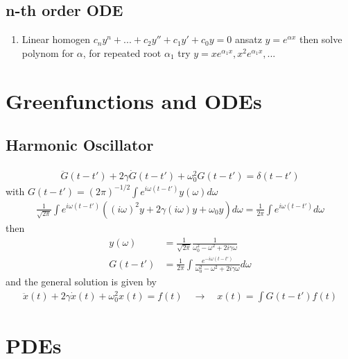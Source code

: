 \documentclass[../main.tex]{subfiles}
\begin{document}
\subsection{n-th order ODE}
\begin{enumerate}
\item Linear homogen $c_ny^{n}+...+c_{2}y''+c_{1}y'+c_{0}y=0$ ansatz $y=e^{\alpha x}$ then solve polynom for $\alpha$,  for repeated root $\alpha_1$ try $y=xe^{\alpha_1 x}, x^2e^{\alpha_1 x}, ...$
\end{enumerate}




\section{Greenfunctions and ODEs}
\subsection{Harmonic Oscillator}
\begin{align}
\ddot{G}(t-t')+2\gamma\dot{G}(t-t')+\omega_0^2G(t-t')=\delta(t-t')
\end{align}
with $G(t-t')=(2\pi)^{-1/2}\int e^{i\omega (t-t')}y(\omega)d\omega$
\begin{align}
\frac{1}{\sqrt{2\pi}}\int e^{i\omega (t-t')}\left((i\omega)^2y+2\gamma(i\omega)y+\omega_0y\right)d\omega=\frac{1}{2\pi}\int e^{i\omega(t-t')}d\omega
\end{align}
then
\begin{align}
y(\omega)&=\frac{1}{\sqrt{2\pi}}\frac{1}{\omega_0^2-\omega^2+2i\gamma\omega}\\
G(t-t')&=\frac{1}{2\pi}\int \frac{e^{-i\omega(t-t')}}{\omega_0^2-\omega^2+2i\gamma\omega}d\omega
\end{align}
and the general solution is given by
\begin{align}
\ddot{x}(t)+2\gamma\dot{x}(t)+\omega_0^2x(t)=f(t)\quad\rightarrow\quad
x(t)=\int G(t-t')f(t)
\end{align}

\section{PDEs}
\end{document}
